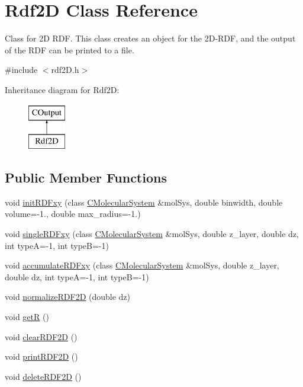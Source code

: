 \hypertarget{classRdf2D}{}\section{Rdf2D Class Reference}
\label{classRdf2D}


Class for 2D R\+DF. This class creates an object for the 2D-\/\+R\+DF, and the output of the R\+DF can be printed to a file.  




{\ttfamily \#include $<$rdf2\+D.\+h$>$}

Inheritance diagram for Rdf2D\+:\begin{figure}[H]
\begin{center}
\leavevmode
\includegraphics[height=2.000000cm]{classRdf2D}
\end{center}
\end{figure}
\subsection*{Public Member Functions}
\begin{DoxyCompactItemize}
\item 
void \mbox{\hyperlink{classRdf2D_a767f006de6412394a59f1cae5f7f6b35}{init\+R\+D\+Fxy}} (class \mbox{\hyperlink{classCMolecularSystem}{C\+Molecular\+System}} \&mol\+Sys, double binwidth, double volume=-\/1., double max\+\_\+radius=-\/1.)
\item 
void \mbox{\hyperlink{classRdf2D_afc5ff73aa9c126184e94ee3abfc14ff4}{single\+R\+D\+Fxy}} (class \mbox{\hyperlink{classCMolecularSystem}{C\+Molecular\+System}} \&mol\+Sys, double z\+\_\+layer, double dz, int typeA=-\/1, int typeB=-\/1)
\item 
void \mbox{\hyperlink{classRdf2D_a6c716851d80fd2a7dcfefd219892d87b}{accumulate\+R\+D\+Fxy}} (class \mbox{\hyperlink{classCMolecularSystem}{C\+Molecular\+System}} \&mol\+Sys, double z\+\_\+layer, double dz, int typeA=-\/1, int typeB=-\/1)
\item 
void \mbox{\hyperlink{classRdf2D_a9b929a0187119b7300ed9fe4ba41f979}{normalize\+R\+D\+F2D}} (double dz)
\item 
void \mbox{\hyperlink{classRdf2D_a3c8153b303733b7e5d320f9b20f37b32}{getR}} ()
\item 
void \mbox{\hyperlink{classRdf2D_a9658a9bb2229afda0d743bdc05a27411}{clear\+R\+D\+F2D}} ()
\item 
void \mbox{\hyperlink{classRdf2D_aae00c1526117f6ac63d2c13354b6c404}{print\+R\+D\+F2D}} ()
\item 
void \mbox{\hyperlink{classRdf2D_a8008421c8aedff5887160b455879d36b}{delete\+R\+D\+F2D}} ()
\end{DoxyCompactItemize}
